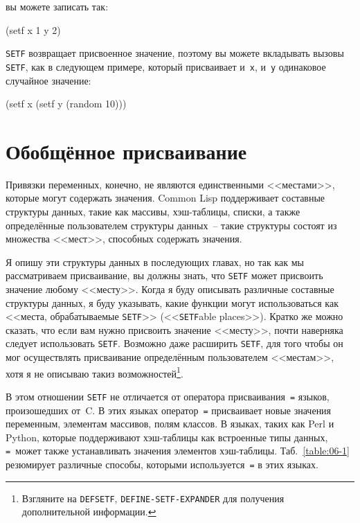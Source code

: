 \noindent{}вы можете записать так:

\begin{myverb}
(setf x 1 y 2)
\end{myverb}

\lstinline{SETF} возвращает присвоенное значение, поэтому вы можете вкладывать вызовы
\lstinline{SETF}, как в следующем примере, который присваивает и~\lstinline{x}, и~\lstinline{y} одинаковое случайное
значение:

\begin{myverb}
(setf x (setf y (random 10)))
\end{myverb}

\section{Обобщённое присваивание}

Привязки переменных, конечно, не являются единственными <<местами>>, которые могут содержать
значения. Common Lisp поддерживает составные структуры данных, такие как массивы,
хэш-таблицы, списки, а также определённые пользователем структуры данных~-- такие
структуры состоят из множества <<мест>>, способных содержать значения.

Я опишу эти структуры данных в последующих главах, но так как мы рассматриваем
присваивание, вы должны знать, что \lstinline{SETF} может присвоить значение любому
<<месту>>. Когда я буду описывать различные составные структуры данных, я буду указывать,
какие функции могут использоваться как <<места, обрабатываемые \lstinline{SETF}>>
(<<\lstinline{SETF}able places>>). Кратко же можно сказать, что если вам нужно присвоить
значение <<месту>>, почти наверняка следует использовать \lstinline{SETF}. Возможно даже
расширить \lstinline{SETF}, для того чтобы он мог осуществлять присваивание определённым
пользователем <<местам>>, хотя я не описываю такиз возможностей\footnote{Взгляните на
  \lstinline{DEFSETF}, \lstinline{DEFINE-SETF-EXPANDER} для получения дополнительной
  информации.}.

В этом отношении \lstinline{SETF} не отличается от оператора присваивания~\lstinline{=} языков,
произошедших от~C. В этих языках оператор~\lstinline{=} присваивает новые значения переменным,
элементам массивов, полям классов. В языках, таких как Perl и Python, которые поддерживают
хэш-таблицы как встроенные типы данных, \lstinline{=}~может также устанавливать значения
элементов хэш-таблицы. Таб.~\ref{table:06-1} резюмирует различные способы, которыми
используется~\lstinline{=} в этих языках.

